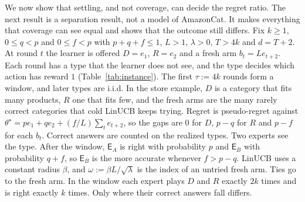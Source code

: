 \documentclass[anon]{alt2027} %
\newif\ifrevmarks\revmarkstrue
\newenvironment{revised}{\ifrevmarks\color{revcolor}\fi}{}
\newcommand{\Exp}{\mathsf{E}}
\begin{document}
\begin{revised}
We now show that settling, and not coverage, can decide the regret ratio.
The next result is a separation result, not a model of AmazonCat. It makes
everything that coverage can see equal and shows that the outcome still
differs. Fix $k\ge1$, $0\le q<p$ and $0\le f<p$ with $p+q+f\le1$, $L>1$,
$\lambda>0$, $T>4k$ and $d=T+2$. At round $t$ the learner is offered
$D=e_1$, $R=e_2$ and a fresh arm $b_t=Le_{t+2}$. Each round has a type that
the learner does not see, and the type decides which action has reward $1$
(Table~\ref{tab:instance}). The first $\tau:=4k$ rounds form a window, and
later types are i.i.d. In the store example, $D$ is a category that fits
many products, $R$ one that fits few, and the fresh arms are the many rarely
correct categories that cold LinUCB keeps trying. Regret is pseudo-regret
against $\theta^\star=pe_1+qe_2+(f/L)\sum_te_{t+2}$, so the gaps are $0$ for
$D$, $p-q$ for $R$ and $p-f$ for each $b_t$. Correct answers are counted on
the realized types. Two experts see the type. After the window, $\Exp_A$ is
right with probability $p$ and $\Exp_B$ with probability $q+f$, so $\Exp_B$
is the more accurate whenever $f>p-q$. LinUCB uses a constant radius
$\beta$, and $\omega:=\beta L/\sqrt\lambda$ is the index of an untried fresh
arm. Ties go to the fresh arm. In the window each expert plays $D$ and $R$
exactly $2k$ times and is right exactly $k$ times. Only where their correct
answers fall differs.
\end{revised}
\end{document}
